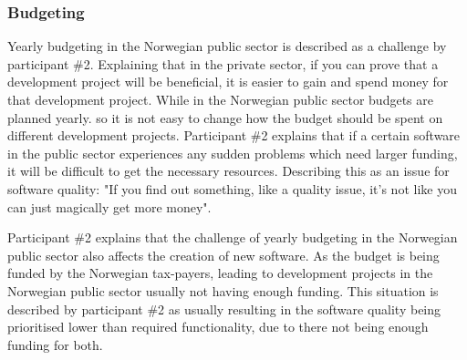 
\subsubsection{Budgeting} \label{sec:budgeting}
Yearly budgeting in the Norwegian public sector is described as a challenge by participant \#2. Explaining that in the private sector, if you can prove that a development project will be beneficial, it is easier to gain and spend money for that development project. While in the Norwegian public sector budgets are planned yearly. so it is not easy to change how the budget should be spent on different development projects. Participant \#2 explains that if a certain software in the public sector experiences any sudden problems which need larger funding, it will be difficult to get the necessary resources. Describing this as an issue for software quality: "If you find out something, like a quality issue, it's not like you can just magically get more money".


Participant \#2 explains that the challenge of yearly budgeting in the Norwegian public sector also affects the creation of new software. As the budget is being funded by the Norwegian tax-payers, leading to development projects in the Norwegian public sector usually not having enough funding. This situation is described by participant \#2 as usually resulting in the software quality being prioritised lower than required functionality, due to there not being enough funding for both.


